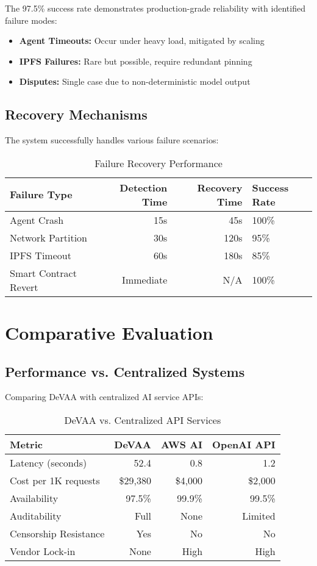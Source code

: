 The 97.5\% success rate demonstrates production-grade reliability with identified failure modes:
\begin{itemize}
    \item \textbf{Agent Timeouts:} Occur under heavy load, mitigated by scaling
    \item \textbf{IPFS Failures:} Rare but possible, require redundant pinning
    \item \textbf{Disputes:} Single case due to non-deterministic model output
\end{itemize}

\subsection{Recovery Mechanisms}

The system successfully handles various failure scenarios:

\begin{table}[h]
\centering
\caption{Failure Recovery Performance}
\label{tab:recovery}
\begin{tabular}{lrrl}
\toprule
\textbf{Failure Type} & \textbf{Detection Time} & \textbf{Recovery Time} & \textbf{Success Rate} \\
\midrule
Agent Crash & 15s & 45s & 100\% \\
Network Partition & 30s & 120s & 95\% \\
IPFS Timeout & 60s & 180s & 85\% \\
Smart Contract Revert & Immediate & N/A & 100\% \\
\bottomrule
\end{tabular}
\end{table}

\section{Comparative Evaluation}

\subsection{Performance vs. Centralized Systems}

Comparing DeVAA with centralized AI service APIs:

\begin{table}[h!]
\centering
\caption{DeVAA vs. Centralized API Services}
\label{tab:centralized-comparison}
\begin{tabular}{lrrr}
\toprule
\textbf{Metric} & \textbf{DeVAA} & \textbf{AWS AI} & \textbf{OpenAI API} \\
\midrule
Latency (seconds) & 52.4 & 0.8 & 1.2 \\
Cost per 1K requests & \$29,380 & \$4,000 & \$2,000 \\
Availability & 97.5\% & 99.9\% & 99.5\% \\
Auditability & Full & None & Limited \\
Censorship Resistance & Yes & No & No \\
Vendor Lock-in & None & High & High \\
\bottomrule
\end{tabular}
\end{table}

